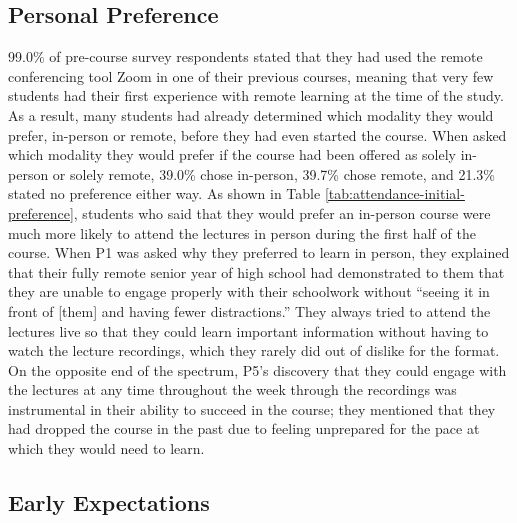 \subsection{Personal Preference}

99.0\% of pre-course survey respondents stated that they had used the remote conferencing tool Zoom in one of their previous courses, meaning that very few students had their first experience with remote learning at the time of the study. As a result, many students had already determined which modality they would prefer, in-person or remote, before they had even started the course. When asked which modality they would prefer if the course had been offered as solely in-person or solely remote, 39.0\% chose in-person, 39.7\% chose remote, and 21.3\% stated no preference either way. As shown in Table \ref{tab:attendance-initial-preference}, students who said that they would prefer an in-person course were much more likely to attend the lectures in person during the first half of the course. When P1 was asked why they preferred to learn in person, they explained that their fully remote senior year of high school had demonstrated to them that they are unable to engage properly with their schoolwork without “seeing it in front of [them] and having fewer distractions.” They always tried to attend the lectures live so that they could learn important information without having to watch the lecture recordings, which they rarely did out of dislike for the format. On the opposite end of the spectrum, P5’s discovery that they could engage with the lectures at any time throughout the week through the recordings was instrumental in their ability to succeed in the course; they mentioned that they had dropped the course in the past due to feeling unprepared for the pace at which they would need to learn.

\subsection{Early Expectations}

